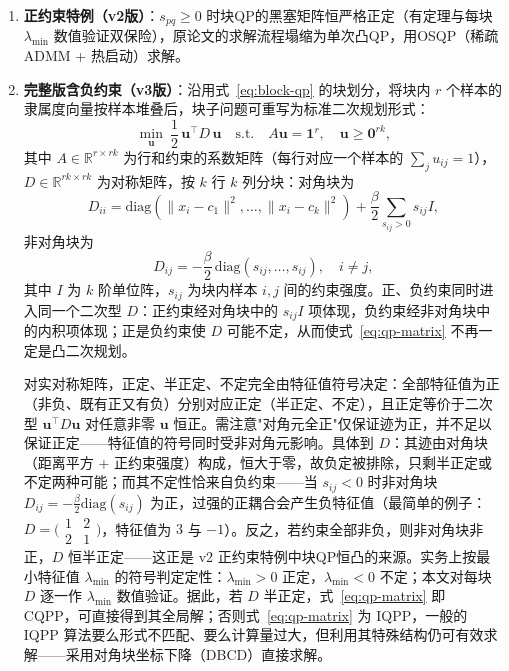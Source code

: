 \documentclass[11pt,a4paper]{ctexart}
\begin{document}
	\begin{enumerate}[label=(\arabic*)]
		\item \textbf{正约束特例（v2版）}：$s_{pq}\ge 0$ 时块QP的黑塞矩阵恒严格正定（有定理与每块 $\lambda_{\min}$ 数值验证双保险），原论文的求解流程塌缩为单次凸QP，用OSQP（稀疏ADMM + 热启动）求解。
		\item \textbf{完整版含负约束（v3版）}：沿用式~\eqref{eq:block-qp} 的块划分，将块内 \(r\) 个样本的隶属度向量按样本堆叠后，块子问题可重写为标准二次规划形式：
		\begin{equation}\label{eq:qp-matrix}
			\min_{\mathbf{u}}\ \frac{1}{2}\,\mathbf{u}^{\top} D\, \mathbf{u}
			\quad \text{s.t.}\quad A\mathbf{u} = \mathbf{1}^{r},\quad \mathbf{u} \ge \mathbf{0}^{rk},
		\end{equation}
		其中 \(A \in \mathbb{R}^{r \times rk}\) 为行和约束的系数矩阵（每行对应一个样本的 \(\sum_j u_{ij} = 1\)），\(D \in \mathbb{R}^{rk \times rk}\) 为对称矩阵，按 \(k\) 行 \(k\) 列分块：对角块为
		\begin{equation}\label{eq:D-diag}
			D_{ii} = \mathrm{diag}\!\left( \|x_i - c_1\|^{2}, \ldots, \|x_i - c_k\|^{2} \right) 
			+ \frac{\beta}{2} \sum_{s_{ij} > 0} s_{ij} I,
		\end{equation}
		非对角块为
		\begin{equation}\label{eq:D-offdiag}
			D_{ij} = -\frac{\beta}{2}\,\mathrm{diag}(s_{ij}, \ldots, s_{ij}), \quad i \ne j,
		\end{equation}
		其中 \(I\) 为 \(k\) 阶单位阵，\(s_{ij}\) 为块内样本 \(i,j\) 间的约束强度。正、负约束同时进入同一个二次型 \(D\)：正约束经对角块中的 \(s_{ij}I\) 项体现，负约束经非对角块中的内积项体现；正是负约束使 \(D\) 可能不定，从而使式~\eqref{eq:qp-matrix} 不再一定是凸二次规划。
		
		对实对称矩阵，正定、半正定、不定完全由特征值符号决定：全部特征值为正（非负、既有正又有负）分别对应正定（半正定、不定），且正定等价于二次型 \(\mathbf{u}^{\top}D\mathbf{u}\) 对任意非零 \(\mathbf{u}\) 恒正。需注意"对角元全正"仅保证迹为正，并不足以保证正定——特征值的符号同时受非对角元影响。具体到 \(D\)：其迹由对角块（距离平方 \(+\) 正约束强度）构成，恒大于零，故负定被排除，只剩半正定或不定两种可能；而其不定性恰来自负约束——当 \(s_{ij}<0\) 时非对角块 \(D_{ij}=-\frac{\beta}{2}\mathrm{diag}(s_{ij})\) 为正，过强的正耦合会产生负特征值（最简单的例子：\(D=\bigl(\begin{smallmatrix}1&2\\2&1\end{smallmatrix}\bigr)\)，特征值为 \(3\) 与 \(-1\)）。反之，若约束全部非负，则非对角块非正，\(D\) 恒半正定——这正是 v2 正约束特例中块QP恒凸的来源。实务上按最小特征值 \(\lambda_{\min}\) 的符号判定定性：\(\lambda_{\min}>0\) 正定，\(\lambda_{\min}<0\) 不定；本文对每块 \(D\) 逐一作 \(\lambda_{\min}\) 数值验证。据此，若 \(D\) 半正定，式~\eqref{eq:qp-matrix} 即 CQPP，可直接得到其全局解；否则式~\eqref{eq:qp-matrix} 为 IQPP，一般的 IQPP 算法要么形式不匹配、要么计算量过大，但利用其特殊结构仍可有效求解——采用对角块坐标下降（DBCD）直接求解。
		

\end{enumerate}
\end{document}

